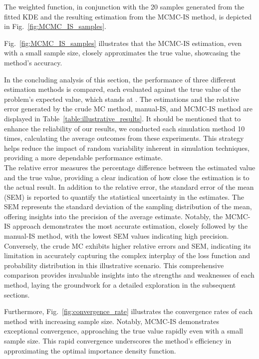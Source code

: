     The weighted function, in conjunction with the 20 samples generated from the fitted KDE and the resulting estimation from the MCMC-IS method, is depicted in Fig.~\ref{fig:MCMC_IS_samples}.
    
    
    
    Fig.~\ref{fig:MCMC_IS_samples} illustrates that the MCMC-IS estimation, even with a small sample size, closely approximates the true value, showcasing the method's accuracy.
    
    In the concluding analysis of this section, the performance of three different estimation methods is compared, each evaluated against the true value of the problem's expected value, which stands at \TrueValue. The estimations and the relative error generated by the crude MC method, manual-IS, and MCMC-IS method are displayed in Table~\ref{table:illustrative_results}. It should be mentioned that to enhance the reliability of our results, we conducted each simulation method 10 times, calculating the average outcomes from these experiments. This strategy helps reduce the impact of random variability inherent in simulation techniques, providing a more dependable performance estimate.\\
        
    

    The relative error measures the percentage difference between the estimated value and the true value, providing a clear indication of how close the estimation is to the actual result. In addition to the relative error, the standard error of the mean (SEM) is reported to quantify the statistical uncertainty in the estimates. The SEM represents the standard deviation of the sampling distribution of the mean, offering insights into the precision of the average estimate. Notably, the MCMC-IS approach demonstrates the most accurate estimation, closely followed by the manual-IS method, with the lowest SEM values indicating high precision. Conversely, the crude MC exhibits higher relative errors and SEM, indicating its limitation in accurately capturing the complex interplay of the loss function and probability distribution in this illustrative scenario. This comprehensive comparison provides invaluable insights into the strengths and weaknesses of each method, laying the groundwork for a detailed exploration in the subsequent sections.

    
    
    Furthermore, Fig.~\ref{fig:convergence_rate} illustrates the convergence rates of each method with increasing sample size. Notably, MCMC-IS demonstrates exceptional convergence, approaching the true value rapidly even with a small sample size. This rapid convergence underscores the method’s efficiency in approximating the optimal importance density function.

    
        
        
